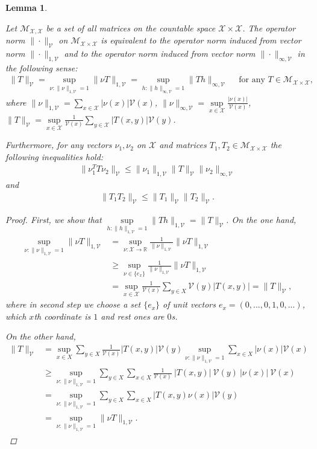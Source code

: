 \documentclass[11pt]{article}
\newcommand{\R}{\mathbb{R}}
\newcommand{\X}{\mathcal{X}}
\newcommand{\M}{\mathcal{M}}
\newcommand{\V}{\mathcal{V}}
\newtheorem{lemma}{Lemma}
\theoremstyle{definition}
\numberwithin{equation}{section}
\begin{document}
 \begin{lemma}\label{lem:norms}


Let $\M_{\X, \X}$ be a set of all matrices on the countable space $\X\times \X$.
 The operator norm $\|\cdot\|_\V$ on  $\M_{\X\times \X}$ is equivalent to the operator norm  induced from  vector norm $\|\cdot\|_{1, \V}$ and to the operator norm  induced from vector norm $\|\cdot\|_{\infty, \V}$ in the following sense:
\begin{align*}
\|T\|_\V = \sup\limits_{\nu:\|\nu\|_{1, \V}=1} \|\nu T \|_{1, \V} = \sup\limits_{h:\|h\|_{\infty,\V} = 1} \| Th \|_{\infty, \V}\quad\text{ for any }T\in \M_{\X\times \X},
\end{align*}
where $\|\nu\|_{1, \V}=\sum\limits_{x\in \X} |\nu(x)|\V(x)$, $\|\nu\|_{\infty, \V} = \sup\limits_{x\in \X} \frac{|\nu(x)|}{\V(x)}$, $\|T\|_\V=\sup\limits_{x\in \X} \frac{1}{\V(x)} \sum\limits_{y\in \X} |T(x, y)|\V(y)$.

 Furthermore, for any vectors $\nu_1, \nu_2$ on $\X$ and matrices $T_1,T_2\in \M_{\X\times \X}$ the following inequalities hold:
\begin{align}\label{eq:norms1}
\|\nu_1^T T \nu_2\|_\V\leq \|\nu_1\|_{1, \V}\|T\|_\V\| \nu_2 \|_{\infty, \V}
\end{align}
and
\begin{align}\label{eq:norms2}
\|  T_1 T_2\|_\V\leq \|T_1\|_{\V}\|T_2\|_\V.
\end{align}


\begin{proof}



First, we show that $\sup\limits_{h:\|h\|_{1, \V} = 1} \| Th \|_{1, \V} = \|T\|_\V$. On the one hand,
\begin{align*}
 \sup\limits_{\nu:\|\nu\|_{1, \V}=1} \|\nu T \|_{1, \V}  &= \sup\limits_{\nu: \X\rightarrow \R} \frac{1}{\|\nu\|_{1, \V}} \|\nu T \|_{1, \V}  \\
 &\geq\sup\limits_{ \nu\in \{e_x\}} \frac{1}{\|\nu\|_{1, \V}} \|\nu T \|_{1, \V}   \\
 &=  \sup\limits_{x\in \X} \frac{1}{\V(x)} \sum\limits_{y\in X} \V(y) |T(x, y)| = \|T\|_\V,
\end{align*}
where in second step we choose a set $\{e_x\}$ of unit vectors $ e_x = (0, ...,0,1,0,...)$, which $x$th coordinate is $1$ and rest ones are $0$s.

On the other hand,
\begin{align*}
\|T\|_\V &= \sup\limits_{x\in X} \sum\limits_{y\in X}   \frac{1}{\V(x)} |T(x, y)|  \V(y) \sup\limits_{\nu:\|\nu\|_{1, \V}=1}  \sum\limits_{x\in X} |\nu(x)| \V(x)\\
&\geq \sup\limits_{\nu:\|\nu\|_{1, \V}=1}   \sum\limits_{y\in X}   \sum\limits_{x\in X}  \frac{1}{\V(x)}~|T(x, y)| ~ \V(y) ~ |\nu(x)|~ \V(x)\\
& =\sup\limits_{\nu:\|\nu\|_{1, \V}=1}   \sum\limits_{y\in X}   \sum\limits_{x\in X} |T(x, y) \nu(x)| \V(y) \\
&=\sup\limits_{\nu:\|\nu\|_{1, \V}=1} \|\nu T \|_{1, \V}.
\end{align*}


\end{proof}
\end{lemma}
\end{document}
